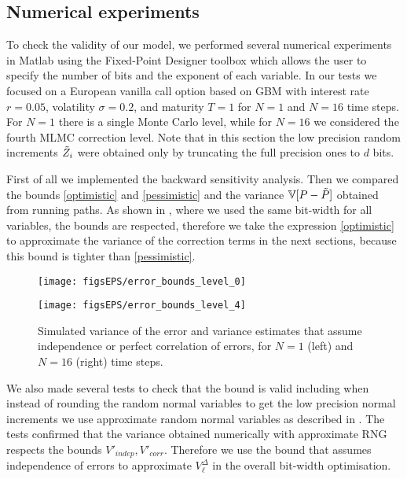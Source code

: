 \subsection{Numerical experiments} To check the validity of our model, we performed several numerical experiments in Matlab using the Fixed-Point Designer toolbox \cite{fi_toolbox} which allows the user to specify the number of bits and the exponent of each variable.
In our tests we focused on a European vanilla call option based on GBM with interest rate $r=0.05$, volatility $\sigma=0.2$, and maturity $T=1$ for $N=1$ and $N=16$ time steps. For $N=1$ there is a single Monte Carlo level, while for $N=16$ we considered the fourth MLMC correction level. Note that in this section the low precision random increments $\Tilde{Z}_i$ were obtained only by truncating the full precision ones to $d$ bits.

First of all we implemented the backward sensitivity analysis.
Then we compared the bounds \eqref{optimistic} and \eqref{pessimistic} and the variance $\mathbb{V}[P-\Tilde{P}]$ obtained from running  paths. As shown in , where we used the same bit-width for all variables, the bounds are respected, therefore we take the expression \eqref{optimistic} to approximate the variance of the correction terms in the next sections, because this bound is tighter than \eqref{pessimistic}.

\begin{figure}[h]
\centering
\begin{minipage}{.5\textwidth}
  \centering
  \texttt{[image: figsEPS/error\_bounds\_level\_0]}
\end{minipage}%
\begin{minipage}{.5\textwidth}
  \centering
  \texttt{[image: figsEPS/error\_bounds\_level\_4]}
\end{minipage}
\caption{Simulated variance of the error and variance estimates that assume independence or perfect correlation of errors, for $N = 1$ (left) and $N=16$ (right) time steps.}
\label{fig:error_model1}
\end{figure}


We also made several tests to check that the bound is valid including when instead of rounding the random normal variables to get the low precision normal increments we use approximate random normal variables as described in . The tests confirmed that the variance obtained numerically with approximate RNG respects the bounds $V'_{indep},V'_{corr}$. Therefore we use the bound that assumes independence of errors to approximate $V^{\Delta}_\ell$ in the overall bit-width optimisation.


